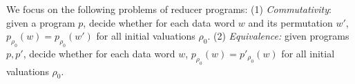 

We focus on the following problems of reducer programs: (1) \emph{Commutativity}: given a program $p$, decide whether for each data word $w$ and its permutation $w'$, $p_{\rho_0}(w) = p_{\rho_0}(w')$ for all initial valuations $\rho_0$. (2) \emph{Equivalence:} given programs $p,p'$, decide whether for each data word $w$, $p_{\rho_0}(w)=p'_{\rho_0}(w)$ for all initial valuations $\rho_0$.





